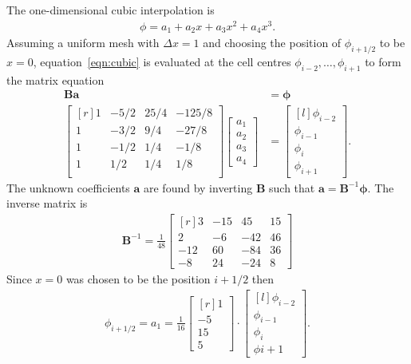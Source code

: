 \documentclass{article}
\begin{document}
The one-dimensional cubic interpolation is
\begin{align}
	\phi = a_1 + a_2 x + a_3 x^2 + a_4 x^3 \text{.} \label{eqn:cubic}
\end{align}
Assuming a uniform mesh with $\Delta x = 1$ and choosing the position of $\phi_{i+1/2}$ to be $x=0$, equation~\eqref{eqn:cubic} is evaluated at the cell centres $\phi_{i-2}, \ldots, \phi_{i+1}$ to form the matrix equation
\begin{align}
	\mathbf{B} \mathbf{a} &= \bm{\phi} \\
	\begin{bmatrix*}[r]
		1 & -5/2 & 25/4 & -125/8 \\
		1 & -3/2 &  9/4 & -27/8 \\
		1 & -1/2 &  1/4 &  -1/8 \\
		1 &  1/2 &  1/4 &   1/8 \\
	\end{bmatrix*}
	\begin{bmatrix}
		a_1 \\
		a_2 \\
		a_3 \\
		a_4
	\end{bmatrix}
	&=
	\begin{bmatrix*}[l]
		\phi_{i-2} \\
		\phi_{i-1} \\
		\phi_i \\
		\phi_{i+1}
	\end{bmatrix*} \text{.}
\end{align}
The unknown coefficients $\mathbf{a}$ are found by inverting $\mathbf{B}$ such that $\mathbf{a} = \mathbf{B}^{-1} \bm{\phi}$.  The inverse matrix is
\begin{align}
	\mathbf{B}^{-1} = 
	\frac{1}{48}
	\begin{bmatrix*}[r]
		3 & -15 & 45 & 15 \\
		2 & -6 & -42 & 46 \\
		-12 & 60 & -84 & 36 \\
		-8 & 24 & -24 & 8
	\end{bmatrix*} \label{eqn:cubicfit-inverse}
\end{align}
Since $x=0$ was chosen to be the position $i+1/2$ then 
\begin{align}
	\phi_{i+1/2} = a_1 = 
	\frac{1}{16}
	\begin{bmatrix*}[r]
		1 \\ -5 \\ 15 \\ 5
	\end{bmatrix*}
	\cdot
	\begin{bmatrix*}[l]
		\phi_{i-2} \\
		\phi_{i-1} \\
		\phi_i \\
		\phi{i+1}
	\end{bmatrix*} \text{.} \label{eqn:cubicfit-fluxcoeffs}
\end{align}
\end{document}
